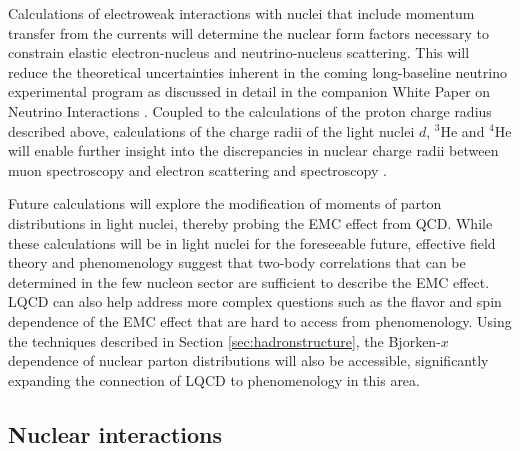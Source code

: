 Calculations of electroweak interactions with nuclei that include momentum transfer from the currents will  determine the  nuclear form factors necessary to constrain  elastic electron-nucleus and  neutrino-nucleus scattering. This will reduce the theoretical uncertainties inherent in the coming long-baseline neutrino experimental program as discussed in detail in the companion White Paper on Neutrino Interactions \cite{Kronfeld:2019nfb}. Coupled to the calculations of the proton charge radius described above, calculations of the charge radii of the light nuclei $d$, $^3$He and $^4$He  will enable further insight into the discrepancies in nuclear charge radii between muon spectroscopy and electron scattering and spectroscopy \cite{Hill:2017wzi}.

Future calculations will explore the modification of moments of parton distributions in light nuclei, thereby probing the EMC effect from QCD. While these calculations will be in light nuclei for the foreseeable future, effective field theory \cite{Chen:2004zx,Chen:2016bde} and phenomenology \cite{Hen:2016kwk} suggest that two-body correlations that can be determined in the few nucleon sector are sufficient to describe the EMC effect. LQCD can also help address more complex questions such as the flavor and spin dependence of the EMC effect that are hard to access from phenomenology. Using the techniques described in Section \ref{sec:hadronstructure}, the Bjorken-$x$ dependence of nuclear parton distributions will also be accessible, significantly expanding the connection of LQCD to phenomenology in this area. 




\subsection{Nuclear interactions}


